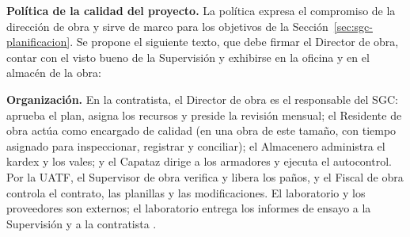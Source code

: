 \textbf{Política de la calidad del proyecto.} La política expresa el compromiso de la dirección de obra y sirve de marco para los objetivos de la Sección~\ref{sec:sgc-planificacion}. Se propone el siguiente texto, que debe firmar el Director de obra, contar con el visto bueno de la Supervisión y exhibirse en la oficina y en el almacén de la obra:

\begin{center}
\end{center}

\textbf{Organización.} En la contratista, el Director de obra es el responsable del SGC: aprueba el plan, asigna los recursos y preside la revisión mensual; el Residente de obra actúa como encargado de calidad (en una obra de este tamaño, con tiempo asignado para inspeccionar, registrar y conciliar); el Almacenero administra el kardex y los vales; y el Capataz dirige a los armadores y ejecuta el autocontrol. Por la UATF, el Supervisor de obra verifica y libera los paños, y el Fiscal de obra controla el contrato, las planillas y las modificaciones. El laboratorio y los proveedores son externos; el laboratorio entrega los informes de ensayo a la Supervisión y a la contratista \parencite[sección 26.12.1.1, p.~602]{aci318_2025}.

